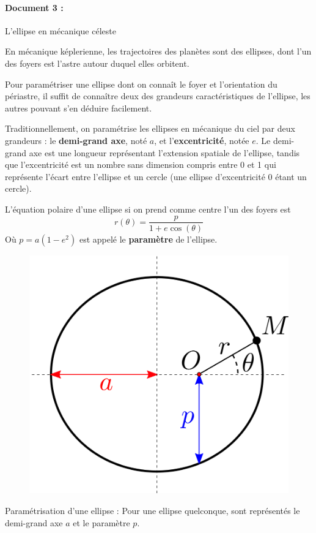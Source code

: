 \paragraph{Document 3 :}\textsf{L'ellipse en mécanique céleste}
\begin{center}\begin{minipage}{.9\textwidth}
En mécanique képlerienne, les trajectoires des planètes sont des ellipses, dont l'un des foyers est l'astre autour duquel elles orbitent.

Pour paramétriser une ellipse dont on connaît le foyer et l'orientation du périastre, il suffit de connaître deux des grandeurs caractéristiques de l'ellipse, les autres pouvant s'en déduire facilement.

Traditionnellement, on paramétrise les ellipses en mécanique du ciel par deux grandeurs : le \textbf{demi-grand axe}, noté $a$, et l'\textbf{excentricité}, notée $e$. Le demi-grand axe est une longueur représentant l'extension spatiale de l'ellipse, tandis que l'excentricité est un nombre sans dimension compris entre 0 et 1 qui représente l'écart entre l'ellipse et un cercle (une ellipse d'excentricité 0 étant un cercle).

L'équation polaire d'une ellipse si on prend comme centre l'un des foyers est 
$$ r(\theta) = \frac{p}{1+e\cos(\theta)} $$
Où $p = a(1 - e^2)$ est appelé le \textbf{paramètre} de l'ellipse.
\end{minipage}\end{center}
\begin{figure}[H]
    \centering
    \includegraphics[width=0.4\linewidth]{oraux/centrale/EllipseVal_big.png}
\end{figure}
\begin{center}\begin{minipage}{.9\textwidth}
Paramétrisation d'une ellipse : Pour une ellipse quelconque, sont représentés le demi-grand axe $a$ et le paramètre $p$.
\end{minipage}\end{center}

